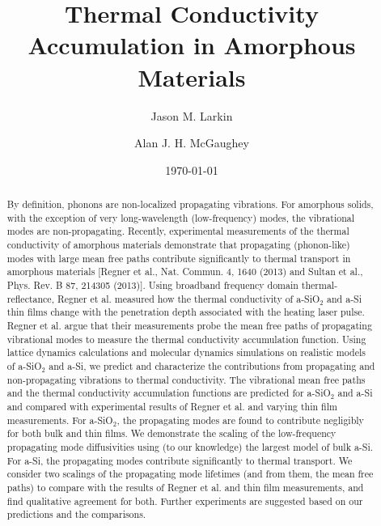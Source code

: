 \documentclass[aps,prb,onecolumn,preprint,superscriptaddress,footinbib,amsmath,amssymb,floatfix]{revtex4}
\begin{document}
\title{Thermal Conductivity Accumulation in Amorphous Materials}
\author{Jason M. Larkin}
\author{Alan J. H. McGaughey}

\date{\today}
\begin{abstract}

By definition, phonons are non-localized propagating vibrations. For 
amorphous solids, with the exception 
of very long-wavelength (low-frequency) modes, the vibrational modes are 
non-propagating. 
Recently, 
experimental measurements of the thermal conductivity of amorphous 
materials demonstrate that 
propagating (phonon-like) modes with large mean free paths 
contribute significantly to thermal transport in amorphous 
materials [Regner et al., Nat. Commun. 4, 1640 (2013) and 
Sultan et al., Phys. Rev. B 87, 214305 (2013)]. 
Using broadband frequency domain thermal-reflectance, 
Regner et al. measured how the thermal conductivity of a-SiO$_2$ and 
a-Si thin films change with the penetration depth associated with the 
heating laser pulse. 
Regner et al. argue that their measurements probe the mean free 
paths of propagating vibrational modes to measure the 
thermal conductivity accumulation function.    
Using lattice dynamics calculations and molecular dynamics simulations 
on 
realistic models of a-SiO$_2$ and a-Si, we predict and 
characterize the contributions from propagating and non-propagating 
vibrations 
to thermal conductivity. The vibrational mean free paths 
and the thermal 
conductivity accumulation functions are predicted for a-SiO$_2$ and a-Si 
and compared with experimental results of 
Regner et al. and varying thin film measurements. 
For a-SiO$_2$, the propagating modes are found to contribute 
negligibly for both bulk and thin films. We demonstrate the scaling 
of the low-frequency propagating mode diffusivities using 
(to our knowledge) the largest model of bulk a-Si.   
For a-Si, the propagating modes contribute significantly to thermal 
transport. We consider two scalings of the propagating mode 
lifetimes (and from them, the mean free paths) to compare with the 
results of Regner et al. and thin film measurements, and find 
qualitative agreement for both. Further 
experiments are suggested based on our predictions and the comparisons. 
\end{abstract}
\maketitle
\end{document}
